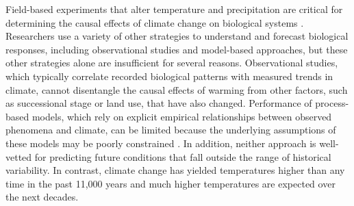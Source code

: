 \documentclass{article}
\begin{document}

\par Field-based experiments that alter temperature and precipitation are critical for determining the causal effects of climate change on biological systems \citep[e.g.,][]{box1978,williams2007,gelman2014}. Researchers use a variety of other strategies to understand and forecast biological responses, including observational studies and model-based approaches, but these other strategies alone are insufficient for several reasons. Observational studies, which typically correlate recorded biological patterns with measured trends in climate, cannot disentangle the causal effects of warming from other factors, such as successional stage or land use, that have also changed. %
 Performance of process-based models, which rely on explicit empirical relationships between observed phenomena and climate, can be limited because the underlying assumptions of these models may be poorly constrained \citep [e.g.,][]{pearson2004,ibanez2006,swab2012,chuine2016}. 
In addition, neither approach is well-vetted for predicting future conditions that fall outside the range of historical variability. In contrast, climate change has yielded temperatures higher than any time in the past 11,000 years and much higher temperatures are expected over the next decades\citep{ohlemuller2006,williams2007,williams2007b,ipcc2013}.  %
\end{document}
